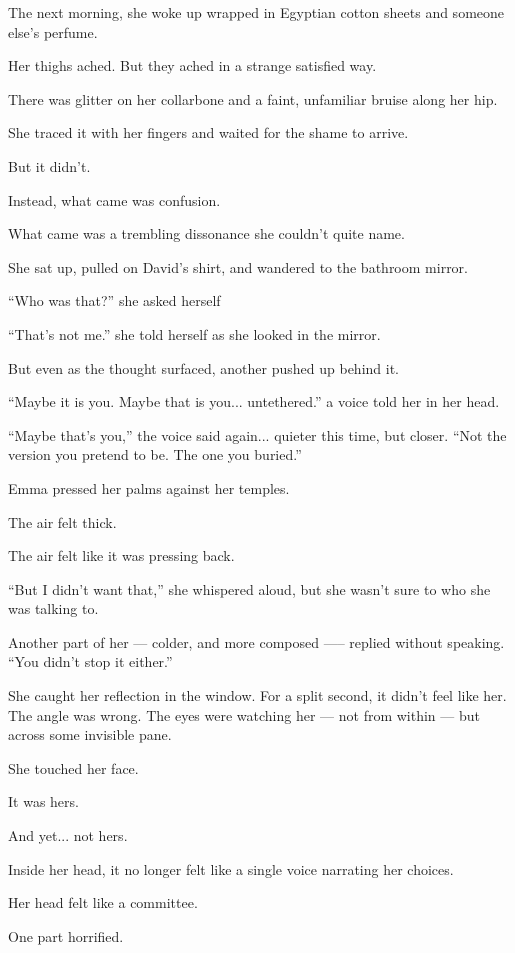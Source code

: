 The next morning, she woke up wrapped in Egyptian cotton sheets and someone else’s 
perfume. 

Her thighs ached. But they ached in a strange satisfied way. 

There was glitter on her collarbone and a faint, unfamiliar 
bruise along her hip. 

She traced it with her fingers and waited for the shame to arrive.

But it didn’t.

Instead, what came was confusion. 

What came was a trembling dissonance she couldn’t quite name.

She sat up, pulled on David’s shirt, and wandered to the bathroom mirror.

``Who was that?'' she asked herself

``That’s not me.'' she told herself as she looked in the mirror.

But even as the thought surfaced, another pushed up behind it.

``Maybe it is you. Maybe that is you... untethered.'' a voice told her in her head.

``Maybe that’s you,'' the voice said again... quieter this time, but closer. 
``Not the version you pretend to be. The one you buried.''

Emma pressed her palms against her temples. 

The air felt thick. 

The air felt like it was pressing back.

``But I didn’t want that,'' she whispered aloud, but she wasn’t sure to who she 
was talking to.

Another part of her --- colder, and more composed —-- replied without speaking.
``You didn’t stop it either.''

She caught her reflection in the window. For a split second, it didn’t feel like 
her. The angle was 
wrong. The eyes were watching her --- not from within --- but across some invisible 
pane.

She touched her face. 

It was hers. 

And yet... not hers.

Inside her head, it no longer felt like a single voice narrating her choices. 

Her head felt like a committee. 

One part horrified. 

